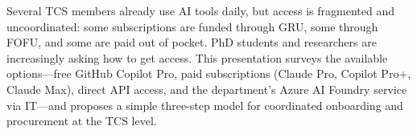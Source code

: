 Several TCS members already use AI tools daily, but access is fragmented and uncoordinated: some
subscriptions are funded through GRU, some through FOFU, and some are paid out of pocket.
PhD students and researchers are increasingly asking how to get access.
This presentation surveys the available options---free GitHub Copilot Pro, paid subscriptions
(Claude Pro, Copilot Pro+, Claude Max), direct API access, and the department's Azure AI Foundry
service via IT---and proposes a simple three-step model for coordinated onboarding and procurement
at the TCS level.
